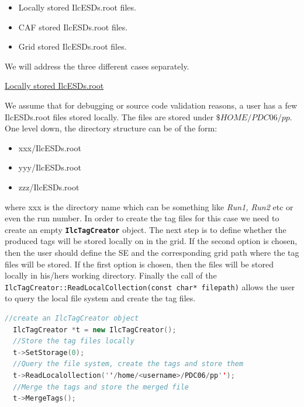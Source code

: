 \documentclass[12pt,a4paper,twoside]{article}
\newcommand{\class}[1]{\texttt{\textbf{#1}}\xspace}
\newcommand{\method}[1]{\texttt{#1}\xspace}
\begin{document}
{\begin{itemize}

\item Locally stored IlcESDs.root files.

\item CAF stored IlcESDs.root files.

\item Grid stored IlcESDs.root files.

\end{itemize}

We will address the three different cases separately.

\underline{Locally stored IlcESDs.root}

We assume that for debugging or source code validation reasons, a user
has a few IlcESDs.root files stored locally. The files are stored
under $\$HOME/PDC06/pp$. One level down, the directory structure can
be of the form:


\begin{itemize}

\item xxx/IlcESDs.root
\item yyy/IlcESDs.root
\item zzz/IlcESDs.root

\end{itemize}

\noindent where xxx is the directory name which can be something like
\emph{Run1, Run2} etc or even the run number. In order to create the
tag files for this case we need to create an empty
\class{IlcTagCreator} object. The next step is to define whether the
produced tags will be stored locally on in the grid. If the second
option is chosen, then the user should define the SE and the
corresponding grid path where the tag files will be stored. If the
first option is chosen, then the files will be stored locally in
his/hers working directory. Finally the call of the
\method{IlcTagCreator::ReadLocalCollection(const char* filepath)}
allows the user to query the local file system and create the tag
files.


\vspace{0.2 cm}

\begin{lstlisting}[language=C++]
  //create an IlcTagCreator object
  IlcTagCreator *t = new IlcTagCreator(); 
  //Store the tag files locally
  t->SetStorage(0);
  //Query the file system, create the tags and store them
  t->ReadLocalollection(''/home/<username>/PDC06/pp'');
  //Merge the tags and store the merged file
  t->MergeTags();
\end{lstlisting}

}
\end{document}
